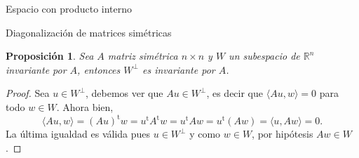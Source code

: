 \documentclass[a4paper,12pt,twoside,spanish,reqno]{amsbook}
\newtheorem{proposicion}[teorema]{Proposici\'on}
\theoremstyle{definition}
\newtheorem{ejemplo}{Ejemplo}[section]
\theoremstyle{remark}
\newcommand{\la}{\langle}
\newcommand{\ra}{\rangle}
\renewcommand{\t}{{\operatorname{t}}}
\newcommand{\R}{\mathbb R}
\begin{document}
\begin{chapter}{Espacio con producto interno}
\begin{section}{Diagonalización de matrices simétricas}
	
	
	\begin{proposicion}\label{wperpinv}
		Sea $A$ matriz simétrica $n \times n$ y $W$ un subespacio de $\R^n$ invariante por $A$, entonces $W^\perp$ es invariante por $A$.
	\end{proposicion}
	\begin{proof}
		Sea $u \in W^\perp$,  debemos ver que $Au \in W^\perp$,  es decir que $\la Au,w\ra =0$ para todo $w \in W$. Ahora bien,
		\begin{equation*}
			\la Au,w\ra =(Au)^\t w = u^\t A^\t w =u^\t A w = u^\t (A w) = \la u, Aw\ra=0.  
		\end{equation*}
		La última igualdad es válida pues $u \in W^\perp$ y  como $w \in W$, por hipótesis $Aw \in W$.
	\end{proof}
	
	
	
 	\begin{comment}
 		\begin{proposicion} Sean $A$ y $B$ dos matrices simétricas. Entonces, $AB$  es simétrica si y sólo  si $A$ y $B$ conmutan. 
 		\end{proposicion}
 		\begin{proof}
 		($\Rightarrow$) Como $AB$ es simétrica, tenemos que $AB = (AB)^\t$. Por proposición \ref{prop-matriz-transpuesta} tenemos que  $(AB)^\t = B^\t A^\t$, y  como $A,B$ son simétricas, $B^\t A^\t = BA$. 
 		Reconstruyendo las igualdades tenemos
 		$$
 		AB = (AB)^\t = B^\t A^\t = BA,
 		$$
 		es decir, $A$ y $B$ conmutan.
 		
 		\vskip .3cm
 		
 		($\Leftarrow$)  
 		$$
 		(AB)^\t = B^\t A^\t = BA=AB.
 		$$
 		\end{proof}
 		
 		
 		\begin{ejemplo}
 		Sean 
 		\begin{equation*}
 		A = \begin{bmatrix} 1&0\\0&2 \end{bmatrix} \quad \text{ y } \quad B = \begin{bmatrix}0&1\\1&0\end{bmatrix}.
 		\end{equation*}
 		Tanto $A$ como $B$ son matrices simétricas. Sin embargo, 
 		\begin{align*}
 		AB = \begin{bmatrix}0&1\\2&0\end{bmatrix} 
 		\end{align*}
 		no es simétrica. Esto ocurre, pues $A$ y $B$ no conmutan. 
 		\end{ejemplo}
 		

\end{comment}
\end{section}
\end{chapter}
\end{document}
